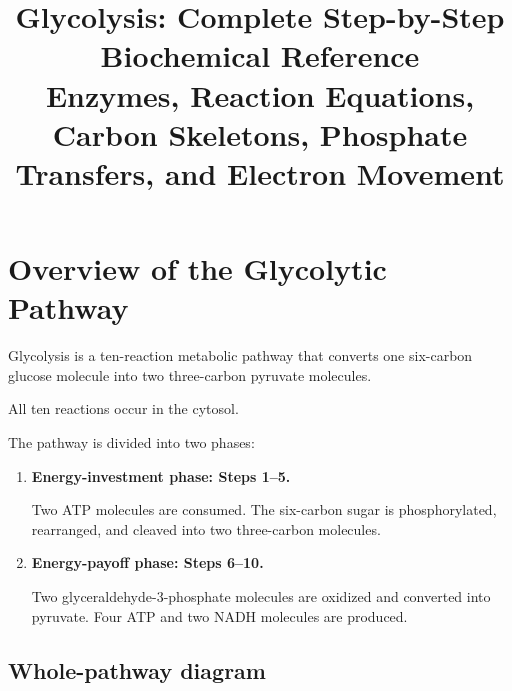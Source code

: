\documentclass[11pt,a4paper]{article}
\title{\textbf{Glycolysis: Complete Step-by-Step Biochemical Reference}\\
\large Enzymes, Reaction Equations, Carbon Skeletons, Phosphate Transfers,
and Electron Movement}
\author{}
\date{}
\begin{document}
\maketitle

\tableofcontents
\newpage

\section{Overview of the Glycolytic Pathway}
\label{sec:overview}

Glycolysis is a ten-reaction metabolic pathway that converts one
six-carbon glucose molecule into two three-carbon pyruvate molecules.

All ten reactions occur in the cytosol.

The pathway is divided into two phases:

\begin{enumerate}[label=\textbf{Phase \arabic*.}]
  \item \textbf{Energy-investment phase: Steps 1--5.}

  Two ATP molecules are consumed. The six-carbon sugar is phosphorylated,
  rearranged, and cleaved into two three-carbon molecules.

  \item \textbf{Energy-payoff phase: Steps 6--10.}

  Two glyceraldehyde-3-phosphate molecules are oxidized and converted
  into pyruvate. Four ATP and two NADH molecules are produced.
\end{enumerate}

\subsection{Whole-pathway diagram}
\end{document}
